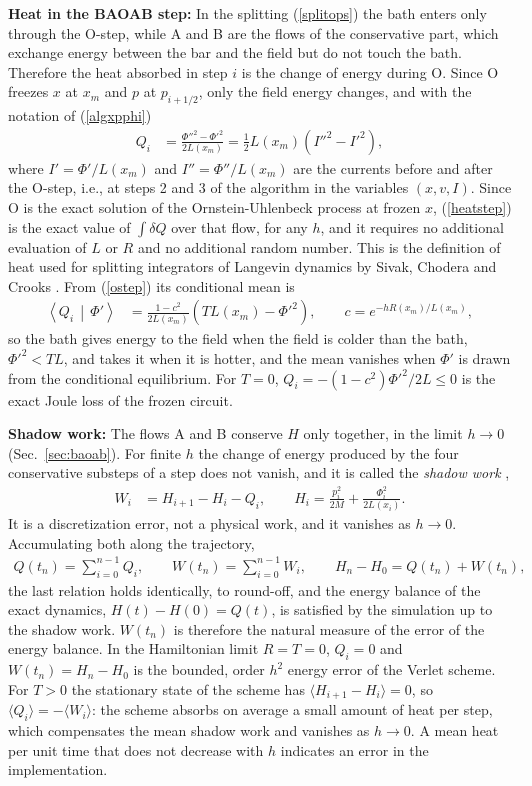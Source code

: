 \documentclass[11pt]{article}
\begin{document}
{\bf Heat in the BAOAB step:} In the splitting (\ref{splitops}) the bath enters only through the O-step, while A and B are the flows of the conservative part, which exchange energy between the bar and the field but do not touch the bath. Therefore the heat absorbed in step $i$ is the change of energy during O. Since O freezes $x$ at $x_m$ and $p$ at $p_{i+1/2}$, only the field energy changes, and with the notation of (\ref{algxpphi})
\begin{align}
  Q_i&=\frac{\Phi''^2-\Phi'^2}{2L(x_m)}=\frac{1}{2}L(x_m)\left(I''^2-I'^2\right),
  \label{heatstep}
\end{align}
where $I'=\Phi'/L(x_m)$ and $I''=\Phi''/L(x_m)$ are the currents before and after the O-step, i.e., at steps 2 and 3 of the algorithm in the variables $(x,v,I)$. Since O is the exact solution of the Ornstein-Uhlenbeck process at frozen $x$, (\ref{heatstep}) is the exact value of $\int\delta Q$ over that flow, for any $h$, and it requires no additional evaluation of $L$ or $R$ and no additional random number. This is the definition of heat used for splitting integrators of Langevin dynamics by Sivak, Chodera and Crooks \cite{sivak}. From (\ref{ostep}) its conditional mean is
\begin{align}
  \left\langle Q_i\,\middle|\,\Phi'\right\rangle&=\frac{1-c^2}{2L(x_m)}\left(TL(x_m)-\Phi'^2\right),\qquad c=e^{-hR(x_m)/L(x_m)},
\end{align}
so the bath gives energy to the field when the field is colder than the bath, $\Phi'^2<TL$, and takes it when it is hotter, and the mean vanishes when $\Phi'$ is drawn from the conditional equilibrium. For $T=0$, $Q_i=-(1-c^2)\Phi'^2/2L\le0$ is the exact Joule loss of the frozen circuit.

{\bf Shadow work:} The flows A and B conserve $H$ only together, in the limit $h\to0$ (Sec.~\ref{sec:baoab}). For finite $h$ the change of energy produced by the four conservative substeps of a step does not vanish, and it is called the {\it shadow work} \cite{sivak},
\begin{align}
  W_i&=H_{i+1}-H_i-Q_i,\qquad H_i=\frac{p_i^2}{2M}+\frac{\Phi_i^2}{2L(x_i)}.
  \label{shadow}
\end{align}
It is a discretization error, not a physical work, and it vanishes as $h\to0$. Accumulating both along the trajectory,
\begin{align}
  Q(t_n)=\sum_{i=0}^{n-1}Q_i,\qquad W(t_n)=\sum_{i=0}^{n-1}W_i,\qquad H_n-H_0=Q(t_n)+W(t_n),
  \label{energybalance}
\end{align}
the last relation holds identically, to round-off, and the energy balance of the exact dynamics, $H(t)-H(0)=Q(t)$, is satisfied by the simulation up to the shadow work. $W(t_n)$ is therefore the natural measure of the error of the energy balance. In the Hamiltonian limit $R=T=0$, $Q_i=0$ and $W(t_n)=H_n-H_0$ is the bounded, order $h^2$ energy error of the Verlet scheme. For $T>0$ the stationary state of the scheme has $\langle H_{i+1}-H_i\rangle=0$, so $\langle Q_i\rangle=-\langle W_i\rangle$: the scheme absorbs on average a small amount of heat per step, which compensates the mean shadow work and vanishes as $h\to0$. A mean heat per unit time that does not decrease with $h$ indicates an error in the implementation.
\end{document}

